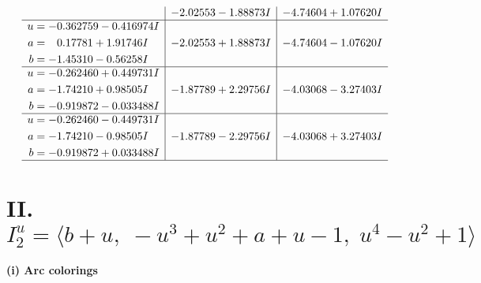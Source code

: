 \documentclass[1p]{elsarticle_modified}
\theoremstyle{definition}
\begin{document}
$$\begin{array}{c|c|c}
 & -2.02553 - 1.88873 I & -4.74604 + 1.07620 I \\ \hline\begin{aligned}
u &= -0.362759 - 0.416974 I \\
a &= \phantom{-}0.17781 + 1.91746 I \\
b &= -1.45310 - 0.56258 I\end{aligned}
 & -2.02553 + 1.88873 I & -4.74604 - 1.07620 I \\ \hline\begin{aligned}
u &= -0.262460 + 0.449731 I \\
a &= -1.74210 + 0.98505 I \\
b &= -0.919872 - 0.033488 I\end{aligned}
 & -1.87789 + 2.29756 I & -4.03068 - 3.27403 I \\ \hline\begin{aligned}
u &= -0.262460 - 0.449731 I \\
a &= -1.74210 - 0.98505 I \\
b &= -0.919872 + 0.033488 I\end{aligned}
 & -1.87789 - 2.29756 I & -4.03068 + 3.27403 I\\
 \hline 
 \end{array}$$\newpage\newpage\renewcommand{\arraystretch}{1}
\centering \section*{II. $I^u_{2}= \langle b+u,\;- u^3+u^2+a+u-1,\;u^4- u^2+1 \rangle$}
\flushleft \textbf{(i) Arc colorings}\\
\end{document}
